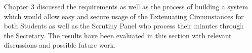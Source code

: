 \documentclass[../main.tex]{subfiles}
\begin{document}
\raggedright
Chapter 3 discussed the requirements as well as the process of building a system which would allow easy and secure usage of the Extenuating Circumstances for both Students as well as the Scrutiny Panel who process their minutes through the Secretary. The results have been evaluated in this section with relevant discussions and possible future work. 
\end{document}
